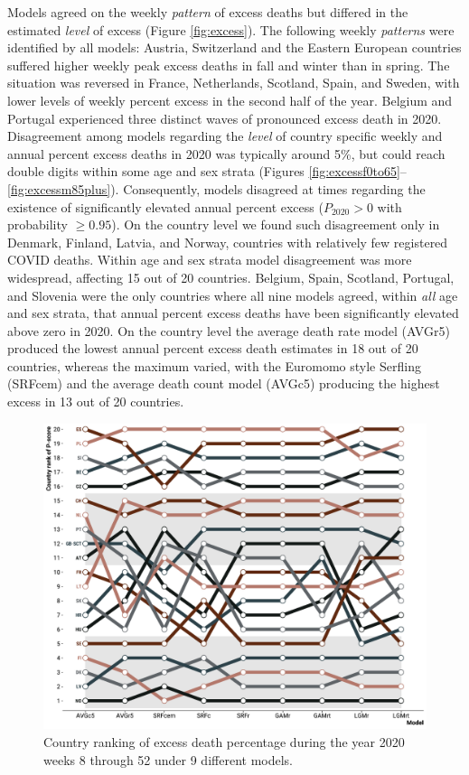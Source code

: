 \documentclass[12pt]{article}
\begin{document}
Models agreed on the weekly \emph{pattern} of excess deaths but differed in the estimated \emph{level} of excess (Figure \ref{fig:excess}). The following weekly \emph{patterns} were identified by all models: Austria, Switzerland and the Eastern European countries suffered higher weekly peak excess deaths in fall and winter than in spring. The situation was reversed in France, Netherlands, Scotland, Spain, and Sweden, with lower levels of weekly percent excess in the second half of the year. Belgium and Portugal experienced three distinct waves of pronounced excess death in 2020. Disagreement among models regarding the \emph{level} of country specific weekly and annual percent excess deaths in 2020 was typically around 5\%, but could reach double digits within some age and sex strata (Figures \ref{fig:excessf0to65}--\ref{fig:excessm85plus}). Consequently, models disagreed at times regarding the existence of significantly elevated annual percent excess ($P_{2020}>0$ with probability $\geq 0.95$). On the country level we found such disagreement only in Denmark, Finland, Latvia, and Norway, countries with relatively few registered COVID deaths. Within age and sex strata model disagreement was more widespread, affecting 15 out of 20 countries. Belgium, Spain, Scotland, Portugal, and Slovenia were the only countries where all nine models agreed, within \emph{all} age and sex strata, that annual percent excess deaths have been significantly elevated above zero in 2020. On the country level the average death rate model (AVGr5) produced the lowest annual percent excess death estimates in 18 out of 20 countries, whereas the maximum varied, with the Euromomo style Serfling (SRFcem) and the average death count model (AVGc5) producing the highest excess in 13 out of 20 countries.


\begin{figure}
  \caption{Country ranking of excess death percentage during the year 2020 weeks 8 through 52 under 9 different models.}
  \label{fig:rank}
  \includegraphics{rank.pdf}
\end{figure}
\end{document}
